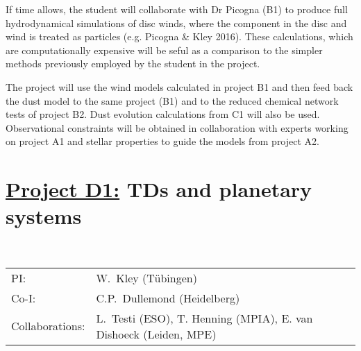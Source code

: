 If time allows, the student will collaborate with Dr Picogna (B1) to produce full hydrodynamical simulations of disc winds, where the component in the disc and wind is treated as particles (e.g. Picogna \& Kley 2016). These calculations, which are computationally expensive will be seful as a comparison to the simpler methods previously employed by the student in the project. 

\vspace{0.5em}
The project will use the wind models calculated in project B1 and then
feed back the dust model to the same project (B1) and to the reduced
chemical network tests of project B2. Dust evolution calculations from C1 will also be used. Observational constraints will
be obtained in collaboration with experts working on project A1 and
stellar properties to guide the models 
from project A2. 



\def\remove#1{}

\section*{\underline{Project D1:} 
TDs and planetary systems}
                
\\
\begin{tabular}{ll}
{\textsf{PI:}}                & W.~Kley (T\"ubingen)\\
{\textsf{Co-I:}}                  & C.P.~Dullemond (Heidelberg)\\
{\textsf{Collaborations:}}      & L.~Testi (ESO), T. Henning (MPIA), E. van Dishoeck (Leiden, MPE) \\
\end{tabular}

\vspace{0.5em}
 \\

